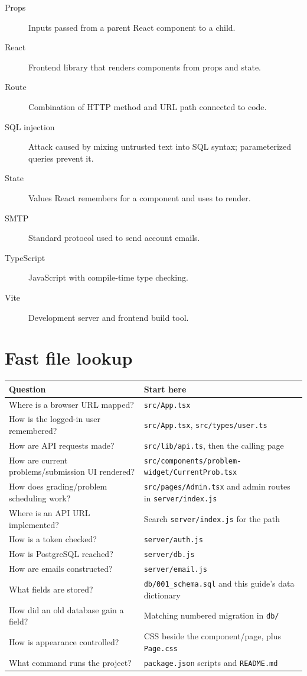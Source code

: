 \documentclass[11pt,oneside]{book}
\newcommand{\file}[1]{\texttt{#1}}
\begin{document}
\begin{description}
  \item[Props] Inputs passed from a parent React component to a child.
  \item[React] Frontend library that renders components from props and state.
  \item[Route] Combination of HTTP method and URL path connected to code.
  \item[SQL injection] Attack caused by mixing untrusted text into SQL syntax; parameterized queries prevent it.
  \item[State] Values React remembers for a component and uses to render.
  \item[SMTP] Standard protocol used to send account emails.
  \item[TypeScript] JavaScript with compile-time type checking.
  \item[Vite] Development server and frontend build tool.
\end{description}

\chapter{Fast file lookup}
\begin{longtable}{p{} p{}}
\toprule
Question & Start here \\
\midrule
\endhead
Where is a browser URL mapped? & \file{src/App.tsx} \\
How is the logged-in user remembered? & \file{src/App.tsx}, \file{src/types/user.ts} \\
How are API requests made? & \file{src/lib/api.ts}, then the calling page \\
How are current problems/submission UI rendered? & \file{src/components/problem-widget/CurrentProb.tsx} \\
How does grading/problem scheduling work? & \file{src/pages/Admin.tsx} and admin routes in \file{server/index.js} \\
Where is an API URL implemented? & Search \file{server/index.js} for the path \\
How is a token checked? & \file{server/auth.js} \\
How is PostgreSQL reached? & \file{server/db.js} \\
How are emails constructed? & \file{server/email.js} \\
What fields are stored? & \file{db/001\_schema.sql} and this guide's data dictionary \\
How did an old database gain a field? & Matching numbered migration in \file{db/} \\
How is appearance controlled? & CSS beside the component/page, plus \file{Page.css} \\
What command runs the project? & \file{package.json} scripts and \file{README.md} \\
\bottomrule
\end{longtable}
\end{document}
